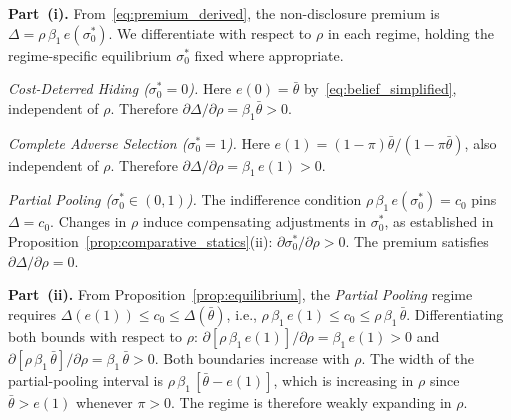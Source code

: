 \textbf{Part~(i).}
From~\eqref{eq:premium_derived}, the non-disclosure premium is $\Delta = \rho\,\beta_1\,e(\sigma_0^*)$. We differentiate with respect to $\rho$ in each regime, holding the regime-specific equilibrium $\sigma_0^*$ fixed where appropriate.

\medskip
\textit{Cost-Deterred Hiding ($\sigma_0^* = 0$).} Here $e(0) = \bar{\theta}$ by~\eqref{eq:belief_simplified}, independent of $\rho$. Therefore $\partial\Delta/\partial\rho = \beta_1\bar{\theta} > 0$.

\textit{Complete Adverse Selection ($\sigma_0^* = 1$).} Here $e(1) = (1-\pi)\bar{\theta}/(1-\pi\bar{\theta})$, also independent of $\rho$. Therefore $\partial\Delta/\partial\rho = \beta_1\,e(1) > 0$.

\textit{Partial Pooling ($\sigma_0^*\in(0,1)$).} The indifference condition $\rho\,\beta_1\,e(\sigma_0^*) = c_0$ pins $\Delta = c_0$. Changes in $\rho$ induce compensating adjustments in $\sigma_0^*$, as established in Proposition~\ref{prop:comparative_statics}(ii): $\partial\sigma_0^*/\partial\rho > 0$. The premium satisfies $\partial\Delta/\partial\rho = 0$.

\medskip
\textbf{Part~(ii).}
From Proposition~\ref{prop:equilibrium}, the \emph{Partial Pooling} regime requires $\Delta(e(1)) \leq c_0 \leq \Delta(\bar{\theta})$, i.e., $\rho\,\beta_1\,e(1) \leq c_0 \leq \rho\,\beta_1\,\bar{\theta}$. Differentiating both bounds with respect to $\rho$: $\partial[\rho\,\beta_1\,e(1)]/\partial\rho = \beta_1\,e(1) > 0$ and $\partial[\rho\,\beta_1\,\bar{\theta}]/\partial\rho = \beta_1\,\bar{\theta} > 0$. Both boundaries increase with $\rho$. The width of the partial-pooling interval is $\rho\,\beta_1\,[\bar{\theta} - e(1)]$, which is increasing in $\rho$ since $\bar{\theta} > e(1)$ whenever $\pi > 0$. The regime is therefore weakly expanding in $\rho$.
